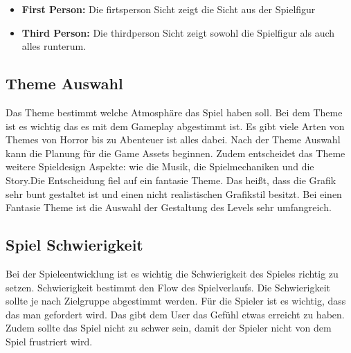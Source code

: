 \begin{itemize}
    \item \textbf{First Person:}
    \noindent Die firtsperson Sicht zeigt die Sicht aus der Spielfigur
    \item \textbf{Third Person:}
    \noindent Die thirdperson Sicht zeigt sowohl die Spielfigur als auch alles runterum. 
\end{itemize}

\subsection{Theme Auswahl}
Das Theme bestimmt welche Atmosphäre das Spiel haben soll. Bei dem Theme ist es wichtig das es mit dem Gameplay abgestimmt ist. Es gibt viele Arten von Themes von Horror bis zu Abenteuer ist alles dabei. Nach der Theme Auswahl kann die Planung für die Game Assets beginnen. Zudem entscheidet das Theme weitere Spieldesign Aspekte: wie die Musik, die Spielmechaniken und die  Story.Die Entscheidung fiel auf ein fantasie Theme. Das heißt, dass die Grafik sehr bunt gestaltet ist und einen nicht realistischen Grafikstil besitzt. Bei einen Fantasie Theme ist die Auswahl der Gestaltung des Levels sehr umfangreich. 


\subsection{Spiel Schwierigkeit}

Bei der Spieleentwicklung ist es wichtig die Schwierigkeit des Spieles richtig zu setzen. Schwierigkeit bestimmt den Flow des Spielverlaufs. Die Schwierigkeit sollte je nach Zielgruppe abgestimmt werden. Für die Spieler ist es wichtig, dass das man gefordert wird. Das gibt dem User das Gefühl etwas erreicht zu haben. Zudem sollte das Spiel nicht zu schwer sein, damit der Spieler nicht von dem Spiel frustriert wird.

